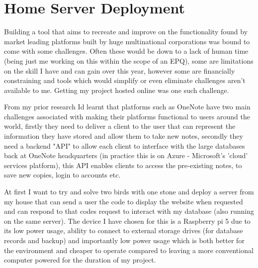 \section{Home Server Deployment}
\label{research:HomeServerDeployment}
Building a tool that aims to recreate and improve on the functionality found by market leading platforms built by huge multinational corporations was bound to come with some challenges. Often these would be down to a lack of human time (being just me working on this within the scope of an EPQ), some are limitations on the skill I have and can gain over this year, however some are financially constraining and tools which would simplify or even eliminate challenges aren't available to me. Getting my project hosted online was one such challenge.

From my prior research Id learnt that platforms such as OneNote have two main challenges associated with making their platforms functional to users around the world, firstly they need to deliver a client to the user that can represent the information they have stored and allow them to take new notes, secondly they need a backend "API" to allow each client to  interface with the large databases back at OneNote headquarters (in practice this is on Azure - Microsoft's 'cloud' services platform), this API enables clients to access the pre-existing notes, to save new copies, login to accounts etc. 

At first I want to try and solve two birds with one stone and deploy a server from my house that can send a user the code to display the website when requested and can respond to that codes request to interact with my database (also running on the same server). The device I have chosen for this is a Raspberry pi 5 due to its low power usage, ability to connect to external storage drives (for database records and backup) and importantly low power usage which is both better for the environment and cheaper to operate compared to leaving a more conventional computer powered for the duration of my project. 

